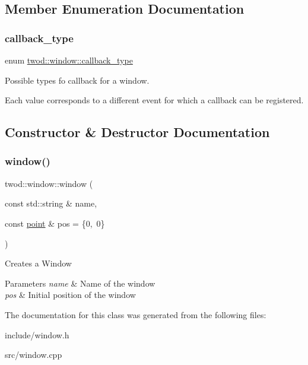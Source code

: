 \subsection{Member Enumeration Documentation}
\mbox{\label{classtwod_1_1window_a3d6203e1119b54e35b4a08db799929da}} 
\subsubsection{\texorpdfstring{callback\+\_\+type}{callback\_type}}
{\footnotesize\ttfamily enum \hyperlink{classtwod_1_1window_a3d6203e1119b54e35b4a08db799929da}{twod\+::window\+::callback\+\_\+type}}

Possible types fo callback for a window.

Each value corresponds to a different event for which a callback can be registered. 

\subsection{Constructor \& Destructor Documentation}
\mbox{\label{classtwod_1_1window_a77c285c655bae5324a9d2b28c5816562}} 
\subsubsection{\texorpdfstring{window()}{window()}}
{\footnotesize\ttfamily twod\+::window\+::window (\begin{DoxyParamCaption}\item[{const std\+::string \&}]{name,  }\item[{const \hyperlink{structtwod_1_1point__t}{point} \&}]{pos = {\ttfamily \{0,~0\}} }\end{DoxyParamCaption})}

Creates a Window 
\begin{DoxyParams}{Parameters}
{\em name} & Name of the window \\
\hline
{\em pos} & Initial position of the window \\
\hline
\end{DoxyParams}


The documentation for this class was generated from the following files\+:\begin{DoxyCompactItemize}
\item 
include/window.\+h\item 
src/window.\+cpp\end{DoxyCompactItemize}
